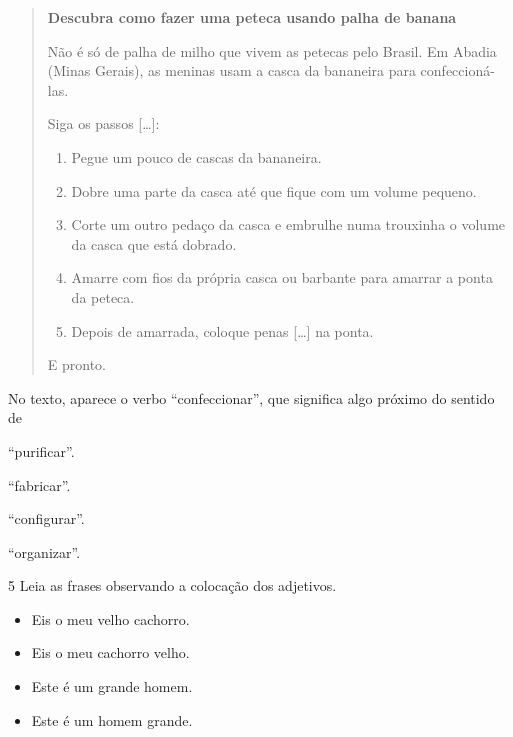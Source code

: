 \begin{quote}
\textbf{Descubra como fazer uma peteca usando palha de banana}

Não é só de palha de milho que vivem as petecas pelo Brasil. Em Abadia
(Minas Gerais), as meninas usam a casca da bananeira para
confeccioná-las.

Siga os passos {[}\ldots{}{]}:

\begin{enumerate}
\item Pegue um pouco de cascas da bananeira.

\item Dobre uma parte da casca até que fique com um volume pequeno.

\item Corte um outro pedaço da casca e embrulhe numa trouxinha o volume da
casca que está dobrado.

\item Amarre com fios da própria casca ou barbante para amarrar a ponta da
peteca.

\item Depois de amarrada, coloque penas {[}\ldots{}{]} na ponta.
\end{enumerate}

E pronto.

\end{quote}

No texto, aparece o verbo ``confeccionar'', que significa algo próximo do sentido de

\begin{escolha}
\item ``purificar''.

\item ``fabricar''.

\item ``configurar''.

\item ``organizar''.
\end{escolha}

\num{5} Leia as frases observando a colocação dos adjetivos.

\begin{itemize}
\item Eis o meu velho cachorro.

\item Eis o meu cachorro velho.

\item Este é um grande homem.

\item Este é um homem grande.
\end{itemize}

